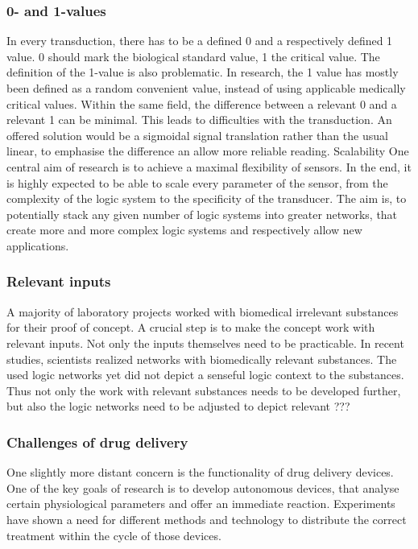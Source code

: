 \documentclass[runningheads]{llncs}
\begin{document}
\subsubsection{0- and 1-values}		In every transduction, there has to be a defined 0 and a respectively defined 1 value. 0 should mark the biological standard value, 1 the critical value. The definition of the 1-value is also problematic. In research, the 1 value has mostly been defined as a random convenient value, instead of using applicable medically critical values. Within the same field, the difference between a relevant 0 and a relevant 1 can be minimal. This leads to difficulties with the transduction. An offered solution would be a sigmoidal signal translation rather than the usual linear, to emphasise the difference an allow more reliable reading.
Scalability		One central aim of research is to achieve a maximal flexibility of sensors. In the end, it is highly expected to be able to scale every parameter of the sensor, from the complexity of the logic system to the specificity of the transducer. The aim is, to potentially stack any given number of logic systems into greater networks, that create more and more complex logic systems and respectively allow new applications.

\subsubsection{Relevant inputs}		A majority of laboratory projects worked with biomedical irrelevant substances for their proof of concept. A crucial step is to make the concept work with relevant inputs. Not only the inputs themselves need to be practicable. In recent studies, scientists realized networks with biomedically relevant substances. The used logic networks yet did not depict a senseful logic context to the substances. Thus not only the work with relevant substances needs to be developed further, but also the logic networks need to be adjusted to depict relevant ???\\

\subsubsection{Challenges of drug delivery}	One slightly more distant concern is the functionality of drug delivery devices. One of the key goals of research is to develop autonomous devices, that analyse certain physiological parameters and offer an immediate reaction. Experiments have shown a need for different methods and technology to distribute the correct treatment within the cycle of those devices.
\end{document}
